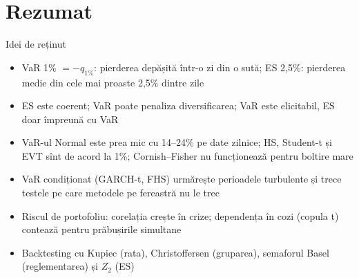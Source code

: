 \section{Rezumat}

\begin{frame}{Idei de reținut}
\itemsize{\small}
\begin{itemize}
    \item VaR 1\% $= -q_{1\%}$: pierderea depășită într-o zi din o sută; ES 2,5\%: pierderea medie din cele mai proaste 2,5\% dintre zile
    \item ES este coerent; VaR poate penaliza diversificarea; VaR este elicitabil, ES doar împreună cu VaR
    \item VaR-ul Normal este prea mic cu 14--24\% pe date zilnice; HS, Student-t și EVT sînt de acord la 1\%; Cornish--Fisher nu funcționează pentru boltire mare
    \item VaR condiționat (GARCH-t, FHS) urmărește perioadele turbulente și trece testele pe care metodele pe fereastră nu le trec
    \item Riscul de portofoliu: corelația crește în crize; dependența în cozi (copula t) contează pentru prăbușirile simultane
    \item Backtesting cu Kupiec (rata), Christoffersen (gruparea), semaforul Basel (reglementarea) și $Z_2$ (ES)
\end{itemize}
\end{frame}

